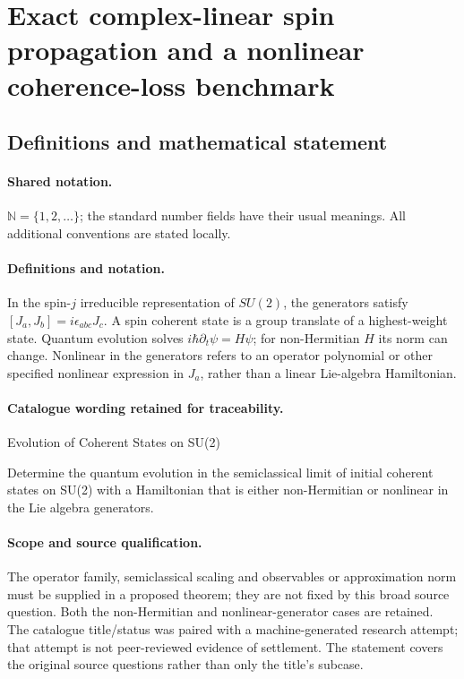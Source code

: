\documentclass[11pt]{article}
\begin{document}
\section{Exact complex-linear spin propagation and a nonlinear coherence-loss benchmark}\label{statement}

\subsection{Definitions and mathematical statement}

\paragraph{Shared notation.}$\mathbb N=\{1,2,\ldots\}$; the standard number fields have their usual meanings. All additional conventions are stated locally.


\paragraph{Definitions and notation.}In the spin-$j$ irreducible representation of $SU(2)$, the generators satisfy $[J_a,J_b]=i\epsilon_{abc}J_c$. A spin coherent state is a group translate of a highest-weight state. Quantum evolution solves $i\hbar\partial_t\psi=H\psi$; for non-Hermitian $H$ its norm can change. Nonlinear in the generators refers to an operator polynomial or other specified nonlinear expression in $J_a$, rather than a linear Lie-algebra Hamiltonian.

\paragraph{Catalogue wording retained for traceability.}
Evolution of Coherent States on SU(2)

Determine the quantum evolution in the semiclassical limit of initial coherent states on SU(2) with a Hamiltonian that is either non-Hermitian or nonlinear in the Lie algebra generators.
\paragraph{Scope and source qualification.}The operator family, semiclassical scaling and observables or approximation norm must be supplied in a proposed theorem; they are not fixed by this broad source question. Both the non-Hermitian and nonlinear-generator cases are retained. The catalogue title/status was paired with a machine-generated research attempt; that attempt is not peer-reviewed evidence of settlement. The statement covers the original source questions rather than only the title’s subcase.
\end{document}
